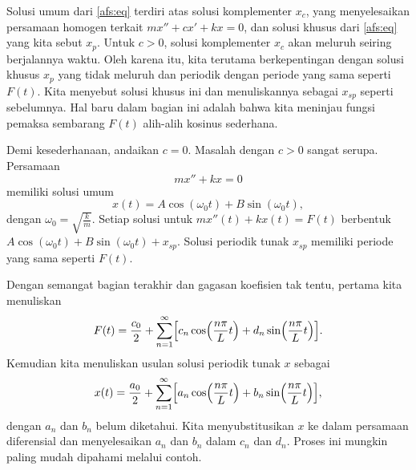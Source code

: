 Solusi umum dari \eqref{afs:eq} terdiri atas solusi komplementer $x_c$, yang
menyelesaikan persamaan homogen terkait $mx'' + cx' + kx = 0$, dan
solusi khusus dari \eqref{afs:eq} yang kita sebut $x_p$.  Untuk $c > 0$,
solusi komplementer $x_c$ akan meluruh seiring berjalannya waktu.
Oleh karena itu,
kita terutama berkepentingan
dengan solusi khusus $x_p$ yang tidak meluruh
dan periodik dengan periode yang sama seperti $F(t)$.  Kita menyebut solusi khusus ini
\emph{} dan menuliskannya sebagai $x_{sp}$ seperti sebelumnya.
Hal baru dalam bagian ini adalah bahwa kita meninjau fungsi pemaksa
sembarang $F(t)$ alih-alih kosinus sederhana.

Demi kesederhanaan, andaikan $c=0$.  Masalah dengan $c > 0$ sangat
serupa.
Persamaan
\begin{equation*}
mx'' + kx = 0 
\end{equation*}
memiliki solusi umum
\begin{equation*}
x(t) = A \cos (\omega_0 t) + 
B \sin (\omega_0 t) ,
\end{equation*}
dengan $\omega_0 = \sqrt{\frac{k}{m}}$.
Setiap solusi untuk
$mx''(t) + kx(t) = F(t)$ berbentuk
$A \cos (\omega_0 t) + B \sin (\omega_0 t) + x_{sp}$.
Solusi periodik
tunak $x_{sp}$ memiliki periode yang sama seperti $F(t)$.

Dengan semangat bagian terakhir dan gagasan koefisien tak tentu,
pertama kita menuliskan
\begin{equation*}
F(t) = \frac{c_0}{2} + \sum_{n=1}^\infty
\Bigl[
c_n \cos \Bigl( \frac{n \pi}{L} t \Bigr) +
d_n \sin \Bigl( \frac{n \pi}{L} t \Bigr)
\Bigr] .
\end{equation*}
Kemudian kita menuliskan usulan solusi periodik tunak $x$ sebagai
\begin{equation*}
x(t) = \frac{a_0}{2} + \sum_{n=1}^\infty
\Bigl[
a_n \cos \Bigl( \frac{n \pi}{L} t \Bigr) +
b_n \sin \Bigl( \frac{n \pi}{L} t \Bigr)
\Bigr],
\end{equation*}
dengan $a_n$ dan $b_n$ belum diketahui.
Kita menyubstitusikan $x$ ke dalam persamaan diferensial dan menyelesaikan $a_n$ dan
$b_n$ dalam $c_n$ dan $d_n$.  Proses ini
mungkin paling mudah dipahami melalui contoh.
\pagebreak[2]

